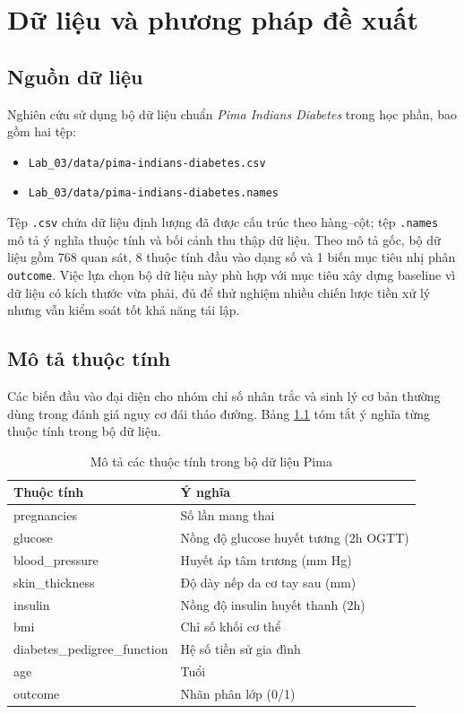 \chapter{Dữ liệu và phương pháp đề xuất}

\section{Nguồn dữ liệu}
Nghiên cứu sử dụng bộ dữ liệu chuẩn \textit{Pima Indians Diabetes} trong học phần, bao gồm hai tệp:
\begin{itemize}[leftmargin=1.5em]
    \item \texttt{Lab\_03/data/pima-indians-diabetes.csv}
    \item \texttt{Lab\_03/data/pima-indians-diabetes.names}
\end{itemize}

Tệp \texttt{.csv} chứa dữ liệu định lượng đã được cấu trúc theo hàng--cột; tệp \texttt{.names} mô tả ý nghĩa
thuộc tính và bối cảnh thu thập dữ liệu. Theo mô tả gốc, bộ dữ liệu gồm 768 quan sát, 8 thuộc tính đầu vào dạng số
và 1 biến mục tiêu nhị phân \texttt{outcome}. Việc lựa chọn bộ dữ liệu này phù hợp với mục tiêu xây dựng baseline
vì dữ liệu có kích thước vừa phải, đủ để thử nghiệm nhiều chiến lược tiền xử lý nhưng vẫn kiểm soát tốt khả năng tái lập.

\section{Mô tả thuộc tính}
Các biến đầu vào đại diện cho nhóm chỉ số nhân trắc và sinh lý cơ bản thường dùng trong đánh giá nguy cơ đái tháo đường.
Bảng \ref{tab:pima_features} tóm tắt ý nghĩa từng thuộc tính trong bộ dữ liệu.

\begin{table}[H]
\centering
\caption{Mô tả các thuộc tính trong bộ dữ liệu Pima}
\label{tab:pima_features}
\begin{tabular}{p{3.5cm}p{9cm}}
\toprule
\textbf{Thuộc tính} & \textbf{Ý nghĩa}\\
\midrule
pregnancies & Số lần mang thai\\
glucose & Nồng độ glucose huyết tương (2h OGTT)\\
blood\_pressure & Huyết áp tâm trương (mm Hg)\\
skin\_thickness & Độ dày nếp da cơ tay sau (mm)\\
insulin & Nồng độ insulin huyết thanh (2h)\\
bmi & Chỉ số khối cơ thể\\
diabetes\_pedigree\_function & Hệ số tiền sử gia đình\\
age & Tuổi\\
outcome & Nhãn phân lớp (0/1)\\
\bottomrule
\end{tabular}
\end{table}

